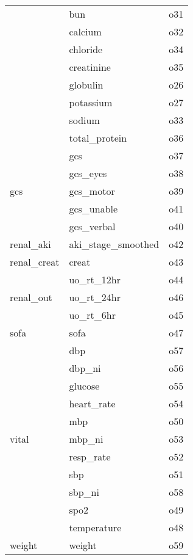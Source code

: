 \begin{longtable}{lll}
\cline{2-3}
 & bun & o31 \\
\cline{2-3}
 & calcium & o32 \\
\cline{2-3}
 & chloride & o34 \\
\cline{2-3}
 & creatinine & o35 \\
\cline{2-3}
 & globulin & o26 \\
\cline{2-3}
 & potassium & o27 \\
\cline{2-3}
 & sodium & o33 \\
\cline{2-3}
 & total_protein & o36 \\
\cline{1-3} \cline{2-3}
\multirow[t]{5}{*}{gcs} & gcs & o37 \\
\cline{2-3}
 & gcs_eyes & o38 \\
\cline{2-3}
 & gcs_motor & o39 \\
\cline{2-3}
 & gcs_unable & o41 \\
\cline{2-3}
 & gcs_verbal & o40 \\
\cline{1-3} \cline{2-3}
renal_aki & aki_stage_smoothed & o42 \\
\cline{1-3} \cline{2-3}
renal_creat & creat & o43 \\
\cline{1-3} \cline{2-3}
\multirow[t]{3}{*}{renal_out} & uo_rt_12hr & o44 \\
\cline{2-3}
 & uo_rt_24hr & o46 \\
\cline{2-3}
 & uo_rt_6hr & o45 \\
\cline{1-3} \cline{2-3}
sofa & sofa & o47 \\
\cline{1-3} \cline{2-3}
\multirow[t]{11}{*}{vital} & dbp & o57 \\
\cline{2-3}
 & dbp_ni & o56 \\
\cline{2-3}
 & glucose & o55 \\
\cline{2-3}
 & heart_rate & o54 \\
\cline{2-3}
 & mbp & o50 \\
\cline{2-3}
 & mbp_ni & o53 \\
\cline{2-3}
 & resp_rate & o52 \\
\cline{2-3}
 & sbp & o51 \\
\cline{2-3}
 & sbp_ni & o58 \\
\cline{2-3}
 & spo2 & o49 \\
\cline{2-3}
 & temperature & o48 \\
\cline{1-3} \cline{2-3}
weight & weight & o59 \\
\cline{1-3} \cline{2-3}
\end{longtable}
